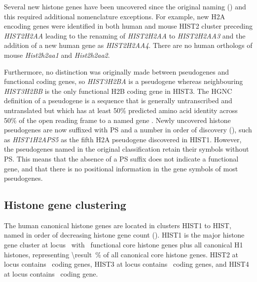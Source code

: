     Several new histone genes have been uncovered since the original
    naming ()
    and this required additional nomenclature exceptions.
    For example, new H2A encoding genes were identified in both human
    and mouse HIST2 cluster preceding \textit{HIST2H2AA}
    leading to the renaming of \textit{HIST2H2AA} to \textit{HIST2H2AA3}
    and the addition of a new human gene as \textit{HIST2H2AA4}.
    There are no human orthologs of mouse \textit{Hist2h2aa1} and \textit{Hist2h2aa2}.

    Furthermore, no distinction was originally made between
    pseudogenes and functional coding genes,
    so \textit{HIST3H2BA} is a pseudogene whereas neighbouring
    \textit{HIST3H2BB} is the only functional H2B coding gene in HIST3.
    The HGNC definition of a pseudogene is 
    a sequence that is generally untranscribed and untranslated 
    but which has at least 50\% predicted amino acid identity 
    across 50\% of the open reading frame to a named gene \citep{HGNC2013}.
    Newly uncovered histone pseudogenes are now suffixed with PS and a
    number in order of discovery (),
    such as \textit{HIST1H2APS5} as the fifth H2A pseudogene discovered in HIST1.
    However, the pseudogenes named in the original classification retain their symbols without PS.
    This means that the absence of a PS suffix does not indicate a functional gene,
    and that there is no positional information in the gene symbols of most pseudogenes.

  \subsection{Histone gene clustering}
    The human canonical histone genes are located in clusters HIST1 to HIST\NumberOfClusters{},
    named in order of decreasing histone gene count ().
    HIST1 is the major histone gene cluster at locus~\HISTOneLocus{}
    with \CoreCodingGenesInHISTOne{}~functional core histone genes plus all canonical H1 histones,
    representing  \SI{\result}{\percent}
    of all canonical core histone genes.
    HIST2 at locus \HISTTwoLocus{} contains \CoreCodingGenesInHISTTwo{}~coding genes,
    HIST3 at locus \HISTThreeLocus{} contains \CoreCodingGenesInHISTThree{}~coding genes,
    and HIST4 at locus \HISTFourLocus{} contains \CoreCodingGenesInHISTFour{}~coding gene.


